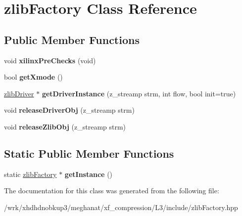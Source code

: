 \hypertarget{classzlibFactory}{\section{zlib\-Factory Class Reference}
\label{classzlibFactory}
}
\subsection*{Public Member Functions}
\begin{DoxyCompactItemize}
\item 
\hypertarget{classzlibFactory_a57eb82dce9977c01c69ead335663f496}{void {\bfseries xilinx\-Pre\-Checks} (void)}\label{classzlibFactory_a57eb82dce9977c01c69ead335663f496}

\item 
\hypertarget{classzlibFactory_add43e901446c41759c6fbd4a9f94273b}{bool {\bfseries get\-Xmode} ()}\label{classzlibFactory_add43e901446c41759c6fbd4a9f94273b}

\item 
\hypertarget{classzlibFactory_aa887e4bcb381d3378f251de6471da566}{\hyperlink{classzlibDriver}{zlib\-Driver} $\ast$ {\bfseries get\-Driver\-Instance} (z\-\_\-streamp strm, int flow, bool init=true)}\label{classzlibFactory_aa887e4bcb381d3378f251de6471da566}

\item 
\hypertarget{classzlibFactory_a140fe8ff09a3189de57e8f561ffe33c3}{void {\bfseries release\-Driver\-Obj} (z\-\_\-streamp strm)}\label{classzlibFactory_a140fe8ff09a3189de57e8f561ffe33c3}

\item 
\hypertarget{classzlibFactory_a4b2736e8d0fc20404478b270c0740f29}{void {\bfseries release\-Zlib\-Obj} (z\-\_\-streamp strm)}\label{classzlibFactory_a4b2736e8d0fc20404478b270c0740f29}

\end{DoxyCompactItemize}
\subsection*{Static Public Member Functions}
\begin{DoxyCompactItemize}
\item 
\hypertarget{classzlibFactory_ae9af1e8b32ad709182e6df8c5184fabe}{static \hyperlink{classzlibFactory}{zlib\-Factory} $\ast$ {\bfseries get\-Instance} ()}\label{classzlibFactory_ae9af1e8b32ad709182e6df8c5184fabe}

\end{DoxyCompactItemize}


The documentation for this class was generated from the following file\-:\begin{DoxyCompactItemize}
\item 
/wrk/xhdhdnobkup3/meghanat/xf\-\_\-compression/\-L3/include/zlib\-Factory.\-hpp\end{DoxyCompactItemize}
